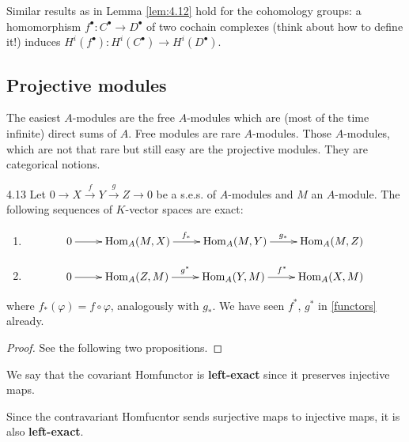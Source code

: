 \documentclass[twoside = false,	%
		headsepline,		%
		parskip = true,
		]{scrbook}						%
\begin{document}
        Similar results as in Lemma \ref{lem:4.12} hold for the cohomology groups: a homomorphism $f^\bullet: C^\bullet \to D^\bullet$ of two cochain complexes (think about how to define it!) induces $H^i(f^\bullet): H^i(C^\bullet) \to H^i(D^\bullet)$.

    \subsection{Projective modules}
        The easiest $A$-modules are the free $A$-modules which are (most of the time infinite) direct sums of $A$. Free modules are rare $A$-modules. Those $A$-modules, which are not that rare but still easy are the projective modules. They are categorical notions.

        \begin{proposition}{}{4.13}
            Let $0 \to X \xrightarrow{f} Y \xrightarrow{g} Z \to 0$ be a s.e.s. of $A$-modules and $M$ an $A$-module. The following sequences of $K$-vector spaces are exact:
            \begin{enumerate}
                \item
                    \begin{equation*}
                    \xymatrix{
                        0 \ar[r] & \Hom_A(M,X) \ar[r]^{f_*} & \Hom_A(M,Y) \ar[r]^{g_*}  & \Hom_A(M,Z)
                    }
                    \end{equation*}
                \item
                    \begin{equation*}
                    \xymatrix {
                        0 \ar[r]& \Hom_A(Z,M) \ar[r]^{g^*} & \Hom_A(Y,M) \ar[r]^{f^*} & \Hom_A(X,M)
                    }
                    \end{equation*}
            \end{enumerate}
            where $f_*(\varphi) = f \circ \varphi$, analogously with $g_*$. We have seen $f^*$, $g^*$ in \ref{functors} already.
        \end{proposition}

        \begin{proof}
            See the following two propositions.
        \end{proof}

        We say that the covariant Homfunctor is \textbf{left-exact} since it preserves injective maps.

        Since the contravariant Homfucntor sends surjective maps to injective maps, it is also \textbf{left-exact}.
\end{document}

